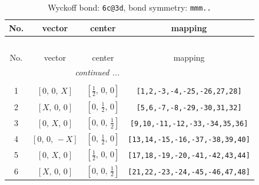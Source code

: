 \documentclass[fleqn,8pt]{jsarticle}
\begin{document}
\begin{longtable}{cccc}
\caption{Wyckoff bond: {\tt 6c@3d}, bond symmetry: {\tt mmm..}}
 \\
 \hline \hline
No. & vector & center & mapping \\ \hline \endfirsthead

\multicolumn{3}{l}{\tablename\ \thetable{}} \\
 \hline \hline
No. & vector & center & mapping \\ \hline \endhead

 \hline \hline
\multicolumn{3}{r}{\footnotesize\it continued ...} \\ \endfoot

 \hline \hline
\multicolumn{3}{r}{} \\ \endlastfoot

1 & $\left[ 0,\, 0,\, X \right]$ & $\left[ \frac{1}{2},\, 0,\, 0 \right]$ & {\tt [1,2,-3,-4,-25,-26,27,28]} \\ \hline
2 & $\left[ X,\, 0,\, 0 \right]$ & $\left[ 0,\, \frac{1}{2},\, 0 \right]$ & {\tt [5,6,-7,-8,-29,-30,31,32]} \\ \hline
3 & $\left[ 0,\, X,\, 0 \right]$ & $\left[ 0,\, 0,\, \frac{1}{2} \right]$ & {\tt [9,10,-11,-12,-33,-34,35,36]} \\ \hline
4 & $\left[ 0,\, 0,\, - X \right]$ & $\left[ 0,\, \frac{1}{2},\, 0 \right]$ & {\tt [13,14,-15,-16,-37,-38,39,40]} \\ \hline
5 & $\left[ 0,\, X,\, 0 \right]$ & $\left[ \frac{1}{2},\, 0,\, 0 \right]$ & {\tt [17,18,-19,-20,-41,-42,43,44]} \\ \hline
6 & $\left[ X,\, 0,\, 0 \right]$ & $\left[ 0,\, 0,\, \frac{1}{2} \right]$ & {\tt [21,22,-23,-24,-45,-46,47,48]} \\
\end{longtable}
\renewcommand{\arraystretch}{1.2}
\end{document}
